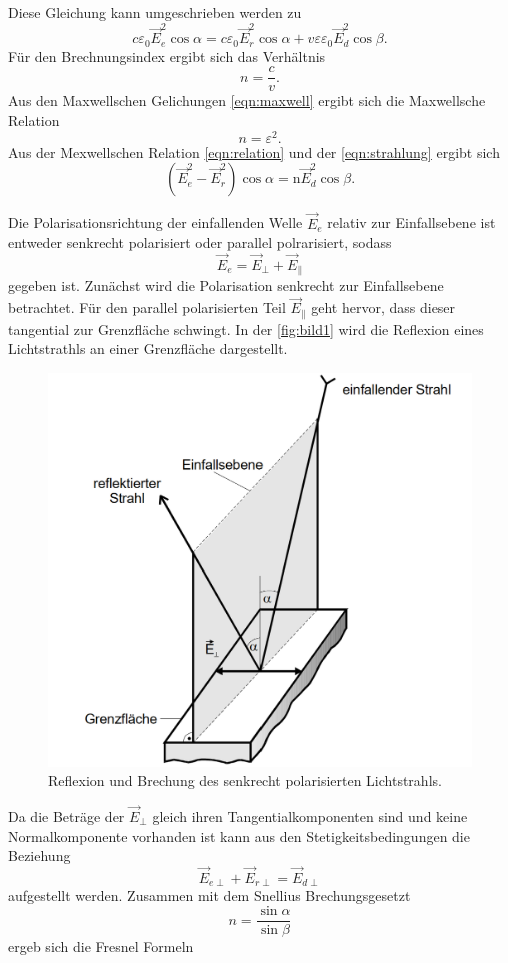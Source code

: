 Diese Gleichung kann umgeschrieben werden zu 
\begin{equation}
        c \varepsilon_0 \vec{E}_e^2 \cos \alpha=c \varepsilon_0 \vec{E}_r^2 \cos \alpha+v \varepsilon \varepsilon_0 \vec{E}_d^2 \cos \beta.
        \label{eqn:strahlung}
\end{equation}
Für den Brechnungsindex ergibt sich das Verhältnis
\begin{equation}
    n = \frac{c}{v}.
    \label{eqn:brechungsindex}
\end{equation}
Aus den Maxwellschen Gelichungen \eqref{eqn:maxwell} ergibt sich die Maxwellsche Relation
\begin{equation}
    n = \varepsilon^2 .
    \label{eqn:relation}
\end{equation}
Aus der Mexwellschen Relation \eqref{eqn:relation} und der \autoref{eqn:strahlung} ergibt sich 
\begin{equation}
    \left(\vec{E}_e^2-\vec{E}_r^2\right) \cos \alpha=\mathrm{n} \vec{E}_d^2 \cos \beta .
\end{equation}

Die Polarisationsrichtung der einfallenden Welle $\vec{E}_e$ relativ zur Einfallsebene ist entweder senkrecht polarisiert oder parallel polrarisiert,
sodass
\begin{equation}
        \vec{E}_e=\vec{E}_{\perp}+\vec{E}_{\|}
\end{equation}
gegeben ist.
Zunächst wird die Polarisation senkrecht zur Einfallsebene betrachtet. Für den parallel polarisierten Teil  $\vec{E}_{\|}$ geht hervor, dass 
dieser tangential zur Grenzfläche schwingt. In der \autoref{fig:bild1} wird die Reflexion eines Lichtstrathls an einer Grenzfläche 
dargestellt.

\begin{figure}[H]
	\centering
	\includegraphics[width=0.5\linewidth]{content/grafik/bild1.png}
	\caption{Reflexion und Brechung des senkrecht polarisierten Lichtstrahls. \cite{fresnel}}
	\label{fig:bild1}
\end{figure}

Da die Beträge der $\vec{E}_{\perp}$ gleich ihren Tangentialkomponenten sind und keine Normalkomponente vorhanden ist kann aus den
Stetigkeitsbedingungen die Beziehung 
\begin{equation*}
    \vec{E}_{e\perp} + \vec{E}_{r \perp} = \vec{E}_{d\perp}
\end{equation*}
aufgestellt werden.  
Zusammen mit dem Snellius Brechungsgesetzt 
\begin{equation}
    n = \frac{\sin \alpha}{\sin \beta}
    \label{eqn:snellius}
\end{equation}
ergeb sich die Fresnel Formeln